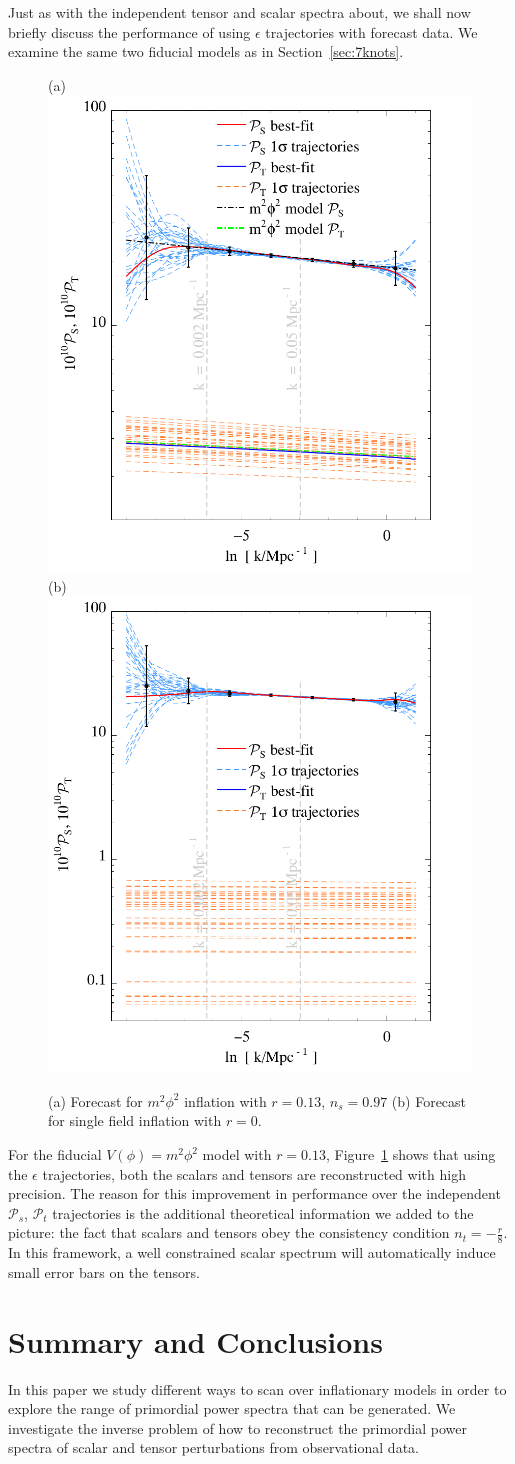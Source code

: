\documentclass[a4paper,11pt]{article}
\newcommand{\pscalar}{{\mathcal{P}_s}}
\newcommand{\ptensor}{{\mathcal{P}_t}}
\begin{document}
Just as with the independent tensor and scalar spectra about, we shall
now briefly discuss the performance of using $\epsilon$ trajectories
with forecast data. We examine the same two fiducial models as
in Section~\ref{sec:7knots}.
\begin{figure}
  (a)\includegraphics[width=0.45\linewidth]{fc_p7eps_traj11}
  (b)\includegraphics[width=0.45\linewidth]{fc_p7eps_r0_traj11}
  \caption{(a) Forecast for $m^2\phi^2$ inflation with $r=0.13$,
    $n_s=0.97$ (b) Forecast for single field inflation with $r=0$.}
  \label{fig:mock_eps}
\end{figure}

For the fiducial $V(\phi)=m^2\phi^2$ model with $r=0.13$,
Figure~\ref{fig:mock_eps} shows that using the $\epsilon$
trajectories, both the scalars and tensors are reconstructed with high
precision. The reason for this improvement in performance over the
independent $\pscalar$, $\ptensor$ trajectories is the additional
theoretical information we added to the picture: the fact that scalars
and tensors obey the consistency condition $n_t=-\frac{r}{8}$. In this
framework, a well constrained scalar spectrum will automatically
induce small error bars on the tensors.


\section{Summary and Conclusions}\label{sec:conclusions}
In this paper we study different ways to scan over inflationary models
in order to explore the range of primordial power spectra that can be
generated. We investigate the inverse problem of how to reconstruct
the primordial power spectra of scalar and tensor perturbations from
observational data.
\end{document}
